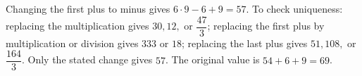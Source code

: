 Changing the first plus to minus gives $6\cdot9-6+9=57$. To check uniqueness: replacing the multiplication gives $30,12,$ or $\dfrac{47}{3}$; replacing the first plus by multiplication or division gives $333$ or $18$; replacing the last plus gives $51,108,$ or $\dfrac{164}{3}$. Only the stated change gives $57$. The original value is $54+6+9=\boxed{69}$.
